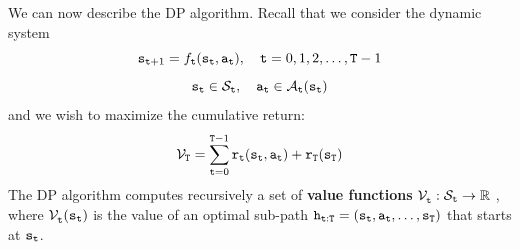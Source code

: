 We can now describe the DP algorithm. Recall that we consider the dynamic system
$${{\tt s}_{{\tt t} + 1}} = {f_{{\tt t}}}({{\tt s}_{{\tt t}}},{{\tt a}_{{\tt t}}}),\quad {\tt t} = 0,1,2, \ldots ,{\tt T} - 1$$
$${{\tt s}_{{\tt t}}} \in {\mathcal{S}_{{\tt t}}},\quad {{\tt a}_{{\tt t}}} \in {\mathcal{A}_{{\tt t}}}({{\tt s}_{{\tt t}}})$$
and we wish to maximize the cumulative return:
$${\mathcal{V}_{\tt T}} = \sum_{{\tt t} = 0}^{{\tt T} - 1} {{{\tt r}_{{\tt t}}}({{\tt s}_{{\tt t}}},{{\tt a}_{{\tt t}}}) + {{\tt r}_{\tt T}}({{\tt s}_{\tt T}})} $$
The DP algorithm computes recursively a set of \textbf{value
functions} $\mathcal{V}_{{\tt t}}^{}:{\mathcal{S}_{{\tt t}}} \to \mathbb{R}$ , where
$\mathcal{V}_{{\tt t}}^{}({{\tt s}_{{\tt t}}})$ is the value of an optimal
sub-path ${{\tt h}_{{\tt t}:{\tt T}}} =
({{\tt s}_{{\tt t}}},{{\tt a}_{{\tt t}}}, \ldots ,{{\tt s}_{\tt T}})$
that starts at ${{\tt s}_{{\tt t}}}$.


